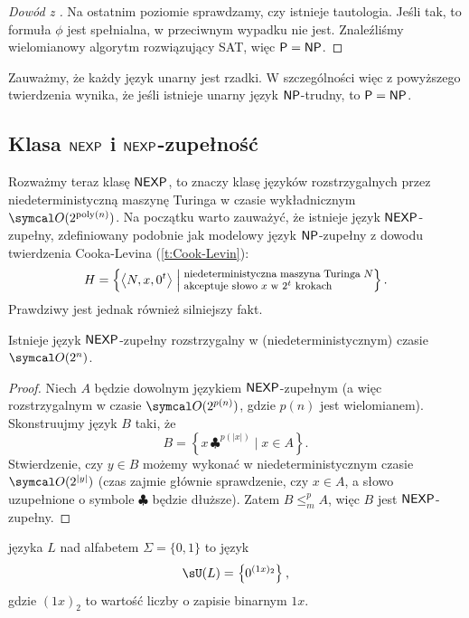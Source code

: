 \begin{proof}[Dowód z \cite{Grochow16}]
    Na ostatnim poziomie sprawdzamy, czy istnieje tautologia. Jeśli tak, to formuła $\phi$ jest spełnialna, w przeciwnym wypadku nie jest.
    Znaleźliśmy wielomianowy algorytm rozwiązujący SAT, więc $\textsf{P} = \textsf{NP}$.
\end{proof}

Zauważmy, że każdy język unarny jest rzadki. W szczególności więc z powyższego twierdzenia wynika, że jeśli istnieje unarny język $\textsf{NP}$-trudny, to $\textsf{P} = \textsf{NP}$.

\subsection{Klasa $\textsf{NEXP}$ i $\textsf{NEXP}$-zupełność}

Rozważmy teraz klasę $\textsf{NEXP}$, to znaczy klasę języków rozstrzygalnych przez niedeterministyczną maszynę Turinga w czasie wykładnicznym $\sO(2^{\poly(n)})$. Na początku warto zauważyć, że istnieje język $\textsf{NEXP}$-zupełny, zdefiniowany podobnie jak modelowy język $\textsf{NP}$-zupełny z dowodu twierdzenia Cooka-Levina (\ref{t:Cook-Levin}):
\[ H = \left\{\encode{N, x, 0^t} \Bigm| \parbox{15em}{\footnotesize niedeterministyczna maszyna Turinga $N$ akceptuje słowo $x$ w $2^t$ krokach}\right\}. \]
Prawdziwy jest jednak również silniejszy fakt.

\begin{lemma}
    Istnieje język $\textsf{NEXP}$-zupełny rozstrzygalny w (niedeterministycznym) czasie $\sO(2^n)$.
\end{lemma}
\begin{proof}
    Niech $A$ będzie dowolnym językiem $\textsf{NEXP}$-zupełnym (a więc rozstrzygalnym w czasie $\sO(2^{p(n)})$, gdzie $p(n)$ jest wielomianem). Skonstruujmy język $B$ taki, że
    \[ B = \left\{x\,\clubsuit^{p(|x|)} \mid x \in A\right\}. \]
    Stwierdzenie, czy $y \in B$ możemy wykonać w niedeterministycznym czasie $\sO(2^{|y|})$ (czas zajmie głównie sprawdzenie, czy $x \in A$, a słowo uzupełnione o symbole $\clubsuit$ będzie dłuższe). Zatem $B \leq_m^p A$, więc $B$ jest $\textsf{NEXP}$-zupełny.
\end{proof}


\begin{definition}
     języka $L$ nad alfabetem $\Sigma = \{0, 1\}$ to język
    \[ \sU(L) = \left\{0^{(1x)_2}\right\}, \]
    gdzie $(1x)_2$ to wartość liczby o zapisie binarnym $1x$.
\end{definition}

